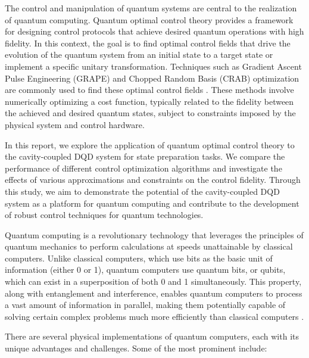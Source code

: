 \documentclass[12pt]{article}
\begin{document}
The control and manipulation of quantum systems are central to the realization of quantum computing. Quantum optimal control theory provides a framework for designing control protocols that achieve desired quantum operations with high fidelity. In this context, the goal is to find optimal control fields that drive the evolution of the quantum system from an initial state to a target state or implement a specific unitary transformation. Techniques such as Gradient Ascent Pulse Engineering (GRAPE) and Chopped Random Basis (CRAB) optimization are commonly used to find these optimal control fields \cite{KHANEJA2005296}. These methods involve numerically optimizing a cost function, typically related to the fidelity between the achieved and desired quantum states, subject to constraints imposed by the physical system and control hardware.

In this report, we explore the application of quantum optimal control theory to the cavity-coupled DQD system for state preparation tasks. We compare the performance of different control optimization algorithms and investigate the effects of various approximations and constraints on the control fidelity. Through this study, we aim to demonstrate the potential of the cavity-coupled DQD system as a platform for quantum computing and contribute to the development of robust control techniques for quantum technologies.


Quantum computing is a revolutionary technology that leverages the principles of quantum mechanics to perform calculations at speeds unattainable by classical computers. Unlike classical computers, which use bits as the basic unit of information (either 0 or 1), quantum computers use quantum bits, or qubits, which can exist in a superposition of both 0 and 1 simultaneously. This property, along with entanglement and interference, enables quantum computers to process a vast amount of information in parallel, making them potentially capable of solving certain complex problems much more efficiently than classical computers \cite{Nielsen2010}.

There are several physical implementations of quantum computers, each with its unique advantages and challenges. Some of the most prominent include:
\end{document}
